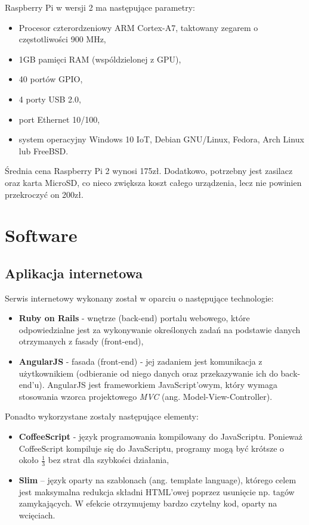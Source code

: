 \documentclass[eng,oneside]{mgr}
\begin{document}
Raspberry Pi w wersji 2 ma następujące parametry:
\begin{itemize}
	\item Procesor czterordzeniowy ARM Cortex-A7, taktowany zegarem o częstotliwości 900 MHz,
	\item 1GB pamięci RAM (wspóldzielonej z GPU),
	\item 40 portów GPIO,
	\item 4 porty USB 2.0,
	\item port Ethernet 10/100,
	\item system operacyjny Windows 10 IoT, Debian GNU/Linux, Fedora, Arch Linux lub FreeBSD.
\end{itemize}

Średnia cena Raspberry Pi 2 wynosi 175zł. Dodatkowo, potrzebny jest zasilacz oraz karta MicroSD, co nieco zwiększa koszt całego urządzenia, lecz nie powinien przekroczyć on 200zł.

\section{Software}
\subsection{Aplikacja internetowa}
Serwis internetowy wykonany został w oparciu o następujące technologie:
\begin{itemize}
	\item \textbf{Ruby on Rails} - wnętrze (back-end) portalu webowego, które odpowiedzialne jest za wykonywanie określonych zadań na podstawie danych otrzymanych z fasady (front-end),
	\item \textbf{AngularJS} - fasada (front-end) - jej zadaniem jest komunikacja z użytkownikiem (odbieranie od niego danych oraz przekazywanie ich do back-end'u). AngularJS jest frameworkiem JavaScript'owym, który wymaga stosowania wzorca projektowego \emph{MVC} (ang. Model-View-Controller).
\end{itemize}
Ponadto wykorzystane zostały następujące elementy:
\begin{itemize}
	\item \textbf{CoffeeScript} - język programowania kompilowany do JavaScriptu. Ponieważ CoffeeScript kompiluje się do JavaScriptu, programy mogą być krótsze o około $\frac{1}{3}$ bez strat dla szybkości działania,
	\item \textbf{Slim} – język oparty na szablonach (ang. template language), którego celem jest maksymalna redukcja składni HTML’owej poprzez usunięcie np. tagów zamykających. W efekcie otrzymujemy bardzo czytelny kod, oparty na wcięciach.
\end{itemize}
\end{document}

